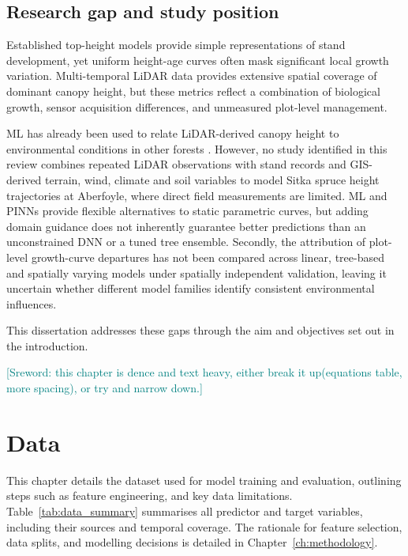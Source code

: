 \documentclass[logo,msc,ai]{infthesis}           %
\newcommand{\sr}[1]{\textcolor{teal}{[Sreword: #1]}}
\begin{document}
\section{Research gap and study position}
\label{sec:background-gap}

Established top-height models provide simple representations of stand development, yet uniform height-age curves often mask significant local growth variation. Multi-temporal LiDAR data provides extensive spatial coverage of dominant canopy height, but these metrics reflect a combination of biological growth, sensor acquisition differences, and unmeasured plot-level management.

ML has already been used to relate LiDAR-derived canopy height to environmental conditions in other forests \cite{fricker2019More_C3_LID}. However, no study identified in this review combines repeated LiDAR observations with stand records and GIS-derived terrain, wind, climate and soil variables to model Sitka spruce height trajectories at Aberfoyle, where direct field measurements are limited. ML and PINNs provide flexible alternatives to static parametric curves, but adding domain guidance does not inherently guarantee better predictions than an unconstrained DNN or a tuned tree ensemble. Secondly, the attribution of plot-level growth-curve departures has not been compared across linear, tree-based and spatially varying models under spatially independent validation, leaving it uncertain whether different model families identify consistent environmental influences.

This dissertation addresses these gaps through the aim and objectives set out in the introduction.


\sr{this chapter is dence and text heavy, either break it up(equations table, more spacing), or try and narrow down.}









\chapter{Data}
\label{ch:data}

This chapter details the dataset used for model training and evaluation, outlining steps such as feature engineering, and key data limitations. Table~\ref{tab:data_summary} summarises all predictor and target variables, including their sources and temporal coverage. The rationale for feature selection, data splits, and modelling decisions is detailed in Chapter~\ref{ch:methodology}.
\end{document}
